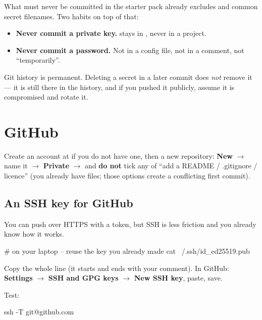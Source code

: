 \begin{trap}{What must never be committed}
 in the starter pack already excludes  and common
secret filenames. Two habits on top of that:

\begin{itemize}
  \item \textbf{Never commit a private key.}  stays in
        , never in a project.
  \item \textbf{Never commit a password.} Not in a config file, not in a
        comment, not ``temporarily''.
\end{itemize}

Git history is permanent. Deleting a secret in a later commit does \emph{not}
remove it --- it is still there in the history, and if you pushed it publicly,
assume it is compromised and rotate it.
\end{trap}

\section{GitHub}

Create an account at  if you do not have one, then a new
repository: \textbf{New} $\rightarrow$ name it 
$\rightarrow$ \textbf{Private} $\rightarrow$ and \textbf{do not} tick any of
``add a README / .gitignore / licence'' (you already have files; those options
create a conflicting first commit).

\subsection{An SSH key for GitHub}

You can push over HTTPS with a token, but SSH is less friction and you already
know how it works.

\begin{shell}
# on your laptop -- reuse the key you already made
cat ~/.ssh/id_ed25519.pub
\end{shell}

Copy the whole line (it starts  and ends with your comment).
In GitHub: \textbf{Settings} $\rightarrow$ \textbf{SSH and GPG keys}
$\rightarrow$ \textbf{New SSH key}, paste, save.

Test:

\begin{shell}
ssh -T git@github.com
\end{shell}

